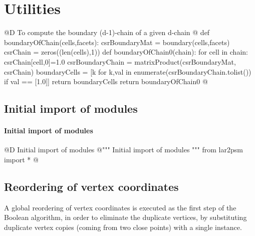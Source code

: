 \documentclass[11pt,oneside]{article}	%
\begin{document}
\appendix
\section{Utilities}

@D To compute the boundary (d-1)-chain of a given d-chain
@{
def boundaryOfChain(cells,facets):
	csrBoundaryMat = boundary(cells,facets)
	csrChain = zeros((len(cells),1))
	def boundaryOfChain0(chain):
		for cell in chain:  csrChain[cell,0]=1.0
		csrBoundaryChain = matrixProduct(csrBoundaryMat, csrChain)
		boundaryCells = [k for k,val in enumerate(csrBoundaryChain.tolist()) 
							if val == [1.0]]
		return boundaryCells
	return boundaryOfChain0
@}


\subsection{Initial import of modules}

\paragraph{Initial import of modules}

@D Initial import of modules
@{""" Initial import of modules """
from lar2psm import *
@}

\subsection{Reordering of vertex coordinates}

A global reordering of vertex coordinates is executed as the first step of the Boolean algorithm, in order to eliminate the duplicate vertices, by substituting duplicate vertex copies (coming from two close points) with a single instance. 
\end{document}
